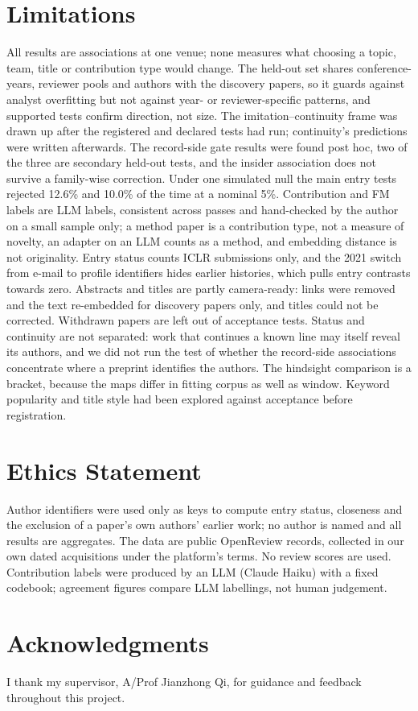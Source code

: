\documentclass[11pt]{article}
\begin{document}
\section*{Limitations}

All results are associations at one venue; none measures what choosing a topic, team, title or contribution
type would change. The held-out set shares conference-years, reviewer pools and authors with the discovery papers, so it guards
against analyst overfitting but not against year- or reviewer-specific patterns, and supported tests confirm
direction, not size. The imitation--continuity frame was drawn up after the registered and declared tests had run;
continuity's predictions were written afterwards. The record-side gate results were found post hoc, two of the three
are secondary held-out tests, and the insider association does not survive a family-wise correction. Under one
simulated null the main entry tests rejected 12.6\% and 10.0\% of the time at a nominal 5\%. Contribution and FM
labels are LLM labels, consistent across passes and hand-checked by the author on a small sample only; a method paper
is a contribution type, not a measure of novelty, an adapter on an LLM counts as a method, and embedding distance is
not originality. Entry status counts ICLR submissions only, and the 2021 switch from e-mail to profile identifiers
hides earlier histories, which pulls entry contrasts towards zero. Abstracts and titles are partly camera-ready:
links were removed and the text re-embedded for discovery papers only, and titles could not be corrected. Withdrawn
papers are left out of acceptance tests. Status and continuity are not separated: work that continues a known line
may itself reveal its authors, and we did not run the test of whether the record-side associations concentrate where
a preprint identifies the authors. The hindsight comparison is a bracket, because the maps differ in fitting corpus
as well as window. Keyword popularity and title style had been explored against acceptance before registration.

\section*{Ethics Statement}

Author identifiers were used only as keys to compute entry status, closeness and the exclusion of a paper's own
authors' earlier work; no author is named and all results are aggregates. The data are public OpenReview records,
collected in our own dated acquisitions under the platform's terms. No review scores are used. Contribution labels
were produced by an LLM (Claude Haiku) with a fixed codebook; agreement figures compare LLM labellings, not human
judgement.

\section*{Acknowledgments}

I thank my supervisor, A/Prof Jianzhong Qi, for guidance and feedback throughout this project.



\appendix
{}
\end{document}
